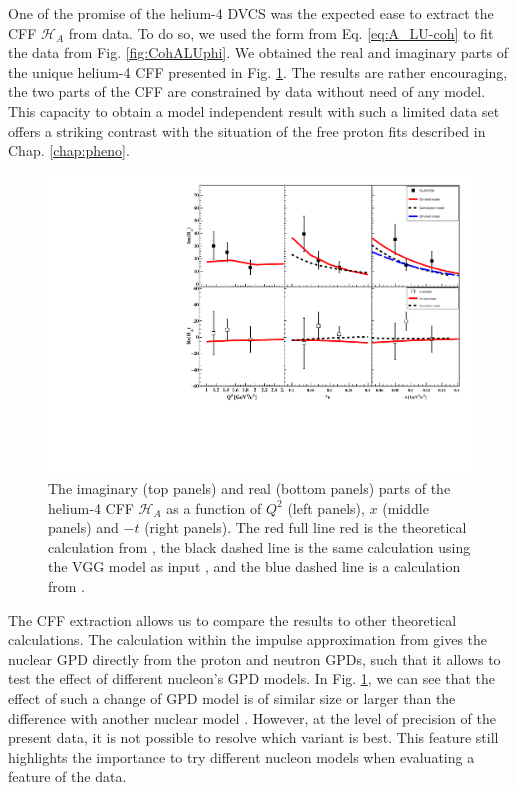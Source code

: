\documentclass[aps,prc,preprint,superscriptaddress]{revtex4}
\begin{document}

One of the promise of the helium-4 DVCS was the expected ease to extract the CFF $\mathcal{H}_A$ from
data. To do so, we used the form from Eq. \ref{eq:A_LU-coh} to fit the data from Fig. 
\ref{fig:CohALUphi}. We obtained the real and imaginary parts of the unique helium-4
CFF presented in Fig. \ref{fig:CohCFF}. The results are rather encouraging, the two parts
of the CFF are constrained by data without need of any model. This capacity to obtain a
model independent result with such a limited data set offers a striking contrast with the
situation of the free proton fits described in Chap. \ref{chap:pheno}.

\begin{figure}[tbp!]
\center
\includegraphics[width=14cm]{fig3/Coherent_CFF.pdf}
	\caption{The imaginary (top panels) and real (bottom panels) parts of the helium-4
	CFF $\mathcal{H}_A$ as a function of $Q^2$ (left panels), $x$ (middle panels) and 
	$-t$ (right panels). The red full line red is the theoretical calculation from 
	\cite{Guzey:2003jh,Guzey:2008th}, the black dashed line is the same calculation 
	using the VGG model as input \cite{Vanderhaeghen:1999xj,Guidal:2004nd}, and
	the blue dashed line is a calculation from \cite{GonzalezHernandez:2012jv}.} 
\label{fig:CohCFF}
\end{figure}

The CFF extraction allows us to compare the results to other theoretical calculations.
The calculation within the impulse approximation from \cite{Guzey:2003jh,Guzey:2008th} 
gives the nuclear GPD directly
from the proton and neutron GPDs, such that it allows to test the effect of different 
nucleon's GPD models. In Fig. \ref{fig:CohCFF}, we can see that the effect of such a change of 
GPD model is of similar size or larger than the difference with another nuclear 
model \cite{GonzalezHernandez:2012jv}. However, at the level of precision of the present data,
it is not possible to resolve which variant is best. This feature still highlights the 
importance to try different nucleon models when evaluating a feature of the data.
\end{document}
